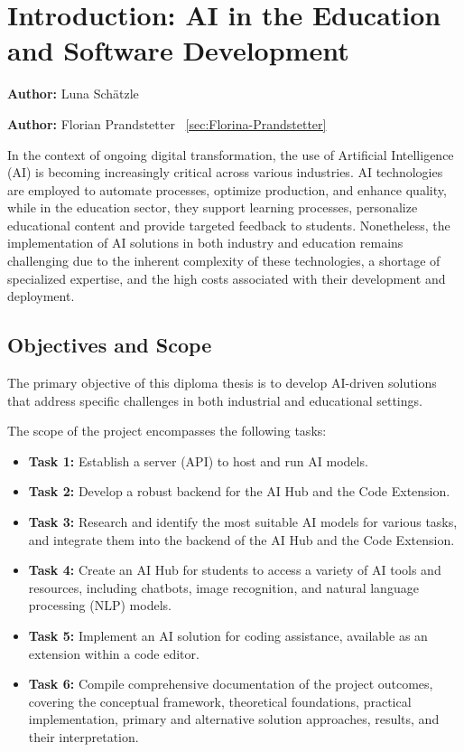 \chapter{Introduction: AI in the Education and Software Development}
\label{chap:introduction}
\textbf{Author:} Luna Schätzle

\textbf{Author:} Florian Prandstetter ~\ref{sec:Florina-Prandstetter}

In the context of ongoing digital transformation, the use of Artificial Intelligence (AI) is becoming increasingly critical across various industries. 
AI technologies are employed to automate processes, optimize production, and enhance quality, while in the education sector, they support learning processes, 
personalize educational content and provide targeted feedback to students. Nonetheless, 
the implementation of AI solutions in both industry and education remains challenging due to the inherent complexity of these technologies, a shortage of specialized expertise, 
and the high costs associated with their development and deployment.

\section{Objectives and Scope}

The primary objective of this diploma thesis is to develop AI-driven solutions that address specific challenges in both industrial and educational settings.

The scope of the project encompasses the following tasks:
\begin{itemize}
    \item \textbf{Task 1:} Establish a server (API) to host and run AI models.
    \item \textbf{Task 2:} Develop a robust backend for the AI Hub and the Code Extension.
    \item \textbf{Task 3:} Research and identify the most suitable AI models for various tasks, and integrate them into the backend of the AI Hub and the Code Extension.
    \item \textbf{Task 4:} Create an AI Hub for students to access a variety of AI tools and resources, including chatbots, image recognition, and natural language processing (NLP) models.
    \item \textbf{Task 5:} Implement an AI solution for coding assistance, available as an extension within a code editor.
    \item \textbf{Task 6:} Compile comprehensive documentation of the project outcomes, covering the conceptual framework, theoretical foundations, practical implementation, primary and alternative solution approaches, results, and their interpretation.
\end{itemize}

